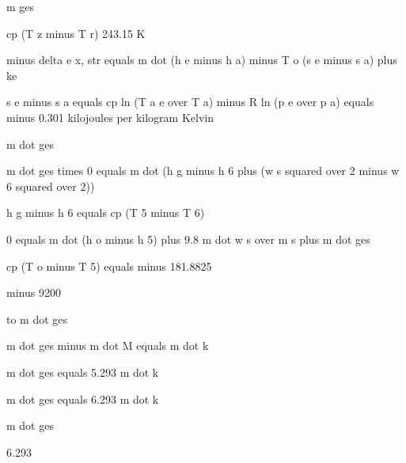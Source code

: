 m ges

cp (T z minus T r) 243.15 K

minus delta e x, str equals m dot (h e minus h a) minus T o (s e minus s a) plus ke

s e minus s a equals cp ln (T a e over T a) minus R ln (p e over p a) equals minus 0.301 kilojoules per kilogram Kelvin

m dot ges

m dot ges times 0 equals m dot (h g minus h 6 plus (w s squared over 2 minus w 6 squared over 2))

h g minus h 6 equals cp (T 5 minus T 6)

0 equals m dot (h o minus h 5) plus 9.8 m dot w s over m s plus m dot ges

cp (T o minus T 5) equals minus 181.8825

minus 9200

to m dot ges

m dot ges minus m dot M equals m dot k

m dot ges equals 5.293 m dot k

m dot ges equals 6.293 m dot k

m dot ges

6.293